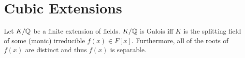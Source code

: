 \documentclass[letterpaper,12pt,fleqn]{article}
\begin{document}
\section*{Cubic Extensions}

\begin{theorem}
  Let $K/\mathbb{Q}$ be a finite extension of fields. $K/\mathbb{Q}$ is Galois iff $K$ is
  the splitting field of some (monic) irreducible $f(x)\in F[x]$. Furthermore,
  all of the roots of $f(x)$ are distinct and thus $f(x)$ is separable.
\end{theorem}
\end{document}
